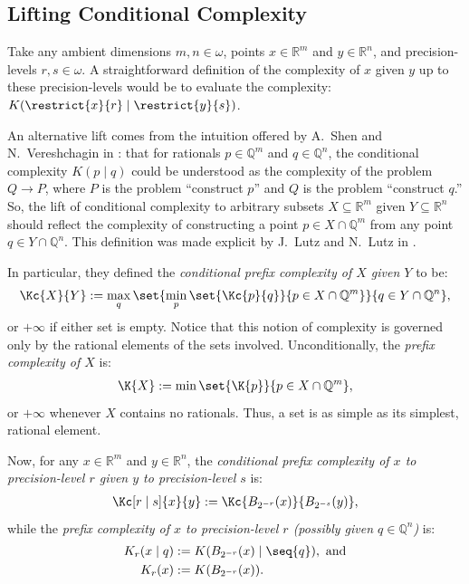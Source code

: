 \subsection{Lifting Conditional Complexity}

Take any ambient dimensions $m, n \in \omega$, points $x \in \mathbb{R}^m$ and $y \in \mathbb{R}^n$, and precision-levels $r, s \in \omega$. A straightforward definition of the complexity of $x$ given $y$ up to these precision-levels would be to evaluate the complexity: $K(\restrict{x}{r} \mid \restrict{y}{s})$. 

An alternative lift comes from the intuition offered by A.~Shen and N.~Vereshchagin in \cite{SV02}: that for rationals $p \in \mathbb{Q}^m$ and $q \in \mathbb{Q}^n$, the conditional complexity $K(p \mid q)$ could be understood as the complexity of the problem $Q \to P$, where $P$ is the problem ``construct $p$'' and $Q$ is the problem ``construct $q$.'' So, the lift of conditional complexity to arbitrary subsets $X \subseteq \mathbb{R}^m$ given $Y \subseteq \mathbb{R}^n$ should reflect the complexity of constructing a point $p \in X \cap \mathbb{Q}^m$ from any point $q \in Y \cap \mathbb{Q}^n$. This definition was made explicit by J.~Lutz and N.~Lutz in \cite{LL18}.

In particular, they defined the \textit{conditional prefix complexity of $X$ given $Y$} to be:
\begin{align*} 
    \Kc{X}{Y} := \max_{q} \set{\min_{p} \set{\Kc{p}{q}}{p \in X \cap \mathbb{Q}^m}}{q \in Y \cap \mathbb{Q}^n},
\end{align*}
or $+\infty$ if either set is empty. Notice that this notion of complexity is governed only by the rational elements of the sets involved. Unconditionally, the \textit{prefix complexity of $X$} is:
\begin{align*}
    \K{X} := \min\set{\K{p}}{p \in X \cap \mathbb{Q}^m},
\end{align*}
or $+\infty$ whenever $X$ contains no rationals. Thus, a set is as simple as its simplest, rational element. 

Now, for any $x \in \mathbb{R}^m$ and $y \in \mathbb{R}^n$, the \textit{conditional prefix complexity of $x$ to precision-level $r$ given $y$ to precision-level $s$} is:
\begin{align*}
    \Kc[r \mid s]{x}{y} := \Kc{B_{2^{-r}}(x)}{B_{2^{-s}}(y)},
\end{align*}
while the \textit{prefix complexity of $x$ to precision-level $r$ (possibly given $q \in \mathbb{Q}^n$)} is:
\begin{align*}
    K_r(x \mid q) &:= K(B_{2^{-r}}(x) \mid \seq{q}), \text{ and}\\
    K_r(x) &:= K(B_{2^{-r}}(x)).
\end{align*}

